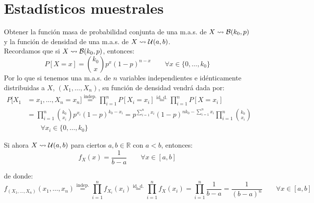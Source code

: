 \section{Estadísticos muestrales}
\begin{ejemplo}
    Obtener la función masa de probabilidad conjunta de una m.a.s. de $X\rightsquigarrow \mathcal{B}(k_0,p)$ y la función de densidad de una m.a.s. de $X\rightsquigarrow \mathcal{U}(a,b)$.\\

    \noindent
    Recordamos que si $X\rightsquigarrow \mathcal{B}(k_0, p)$, entonces:
    \begin{equation*}
        P[X = x] = \binom{k_0}{x} p^x{(1-p)}^{n-x} \qquad \forall x\in \{0,\ldots,k_0\}
    \end{equation*}
    Por lo que si tenemos una m.a.s. de $n$ variables independientes e idénticamente distribuidas a $X$, $(X_1, \ldots, X_n)$, su función de densidad vendrá dada por:
    \begin{align*}
        P[X_1 &= x_1, \ldots, X_n = x_n] \stackrel{\text{indep.}}{=} \prod_{i=1}^{n}P[X_i = x_i]\stackrel{\text{id. d.}}{=} \prod_{i=1}^{n} P[X=x_i] \\
              &= \prod_{i=1}^{n} \binom{k_0}{x_i} p^{x_i} {(1-p)}^{k_0-x_i} = p^{\sum\limits_{i=1}^{n}x_i} {(1-p)}^{nk_0 - \sum\limits_{i=1}^{n}x_i} \prod_{i=1}^{n}\binom{k_0}{x_i} \\
              & \qquad \forall x_i \in \{0,\ldots,k_0\}
    \end{align*}

    \noindent
    Si ahora $X\rightsquigarrow \mathcal{U}(a,b)$ para ciertos $a,b\in \mathbb{R}$ con $a<b$, entonces:
    \begin{equation*}
        f_X(x) = \dfrac{1}{b-a} \qquad \forall x\in [a,b]
    \end{equation*}

    de donde:
    \begin{equation*}
        f_{(X_1, \ldots, X_n)}(x_1, \ldots, x_n) \stackrel{\text{indep.}}{=} \prod_{i=1}^{n} f_{X_i}(x_i)\stackrel{\text{id. d.}}{=} \prod_{i=1}^{n} f_X(x_i) = \prod_{i=1}^{n} \dfrac{1}{b-a} = \dfrac{1}{{(b-a)}^{n}} \qquad \forall x\in [a,b]
    \end{equation*}
\end{ejemplo}

